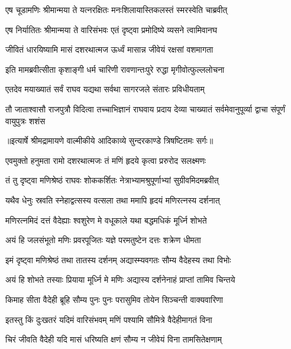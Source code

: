 \twolineshloka
{एष चूडामणिः श्रीमान्मया ते यत्नरक्षितः}
{मनःशिलायास्तिकलस्तं स्मरस्वेति चाब्रवीत्} %

\twolineshloka
{एष निर्यातितः श्रीमान्मया ते वारिसंभवः}
{एतं दृष्ट्वा प्रमोदिष्ये व्यसने त्वामिवानघ} %

\twolineshloka
{जीवितं धारयिष्यामि मासं दशरथात्मज}
{ऊर्ध्वं मासान्न जीवेयं रक्षसां वशमागता} %

\twolineshloka
{इति मामब्रवीत्सीता कृशाङ्गी धर्म चारिणी}
{रावणान्तःपुरे रुद्धा मृगीवोत्फुल्ललोचना} %

\twolineshloka
{एतदेव मयाख्यातं सर्वं राघव यद्यथा}
{सर्वथा सागरजले संतारः प्रविधीयताम्} %

\fourlineindentedshloka
{तौ जाताश्वासौ राजपुत्रौ विदित्वा}
{ तच्चाभिज्ञानं राघवाय प्रदाय}
{देव्या चाख्यातं सर्वमेवानुपूर्व्या}
{द्वाचा संपूर्णं वायुपुत्रः शशंस} %


{॥इत्यार्षे श्रीमद्रामायणे वाल्मीकीये आदिकाव्ये सुन्दरकाण्डे त्रिषष्टितमः सर्गः॥}


\twolineshloka
{एवमुक्तो हनुमता रामो दशरथात्मजः}
{तं मणिं हृदये कृत्वा प्ररुरोद सलक्ष्मणः} %

\twolineshloka
{तं तु दृष्ट्वा मणिश्रेष्ठं राघवः शोककर्शितः}
{नेत्राभ्यामश्रुपूर्णाभ्यां सुग्रीवमिदमब्रवीत्} %

\twolineshloka
{यथैव धेनुः स्रवति स्नेहाद्वत्सस्य वत्सला}
{तथा ममापि हृदयं मणिरत्नस्य दर्शनात्} %

\twolineshloka
{मणिरत्नमिदं दत्तं वैदेह्याः श्वशुरेण मे}
{वधूकाले यथा बद्धमधिकं मूर्ध्नि शोभते} %

\twolineshloka
{अयं हि जलसंभूतो मणिः प्रवरपूजितः}
{यज्ञे परमतुष्टेन दत्तः शक्रेण धीमता} %

\twolineshloka
{इमं दृष्ट्वा मणिश्रेष्ठं तथा तातस्य दर्शनम्}
{अद्यास्म्यवगतः सौम्य वैदेहस्य तथा विभोः} %

\twolineshloka
{अयं हि शोभते तस्याः प्रियाया मूर्ध्नि मे मणिः}
{अद्यास्य दर्शनेनाहं प्राप्तां तामिव चिन्तये} %

\twolineshloka
{किमाह सीता वैदेही ब्रूहि सौम्य पुनः पुनः}
{परासुमिव तोयेन सिञ्चन्ती वाक्यवारिणा} %

\twolineshloka
{इतस्तु किं दुःखतरं यदिमं वारिसंभवम्}
{मणिं पश्यामि सौमित्रे वैदेहीमागतं विना} %

\twolineshloka
{चिरं जीवति वैदेही यदि मासं धरिष्यति}
{क्षणं सौम्य न जीवेयं विना तामसितेक्षणाम्} %

